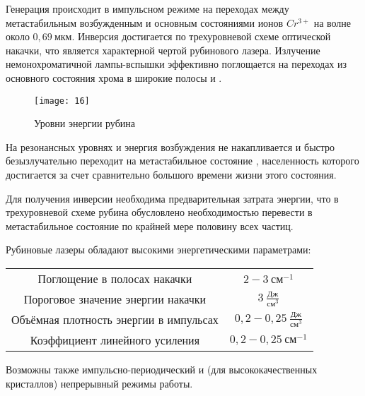 Генерация происходит в импульсном режиме на переходах между метастабильным
возбужденным и основным состояниями ионов \( Cr^{3+} \) на волне около
\( 0,69~\text{мкм} \). Инверсия достигается по трехуровневой схеме оптической
накачки, что является характерной чертой рубинового лазера. Излучение
немонохроматичной лампы-вспышки эффективно поглощается на переходах из
основного состояния хрома  в широкие полосы
 и .

\begin{figure}[h]
    \center
    \texttt{[image: 16]}
    \caption{Уровни энергии рубина}
\end{figure}

На резонансных уровнях  и  энергия возбуждения не
накапливается и быстро безызлучательно переходит на метастабильное состояние 
, населенность которого достигается за счет сравнительно большого 
времени жизни этого состояния.

Для получения инверсии необходима предварительная затрата энергии, что в
трехуровневой схеме рубина обусловлено необходимостью перевести в метастабильное
состояние по крайней мере половину всех частиц.

Рубиновые лазеры обладают высокими энергетическими параметрами:
\begin{center}
    \begin{tabular}{|c|c|} \hline
        Поглощение в полосах накачки & \( 2-3~\text{см}^{-1} \) \\
        Пороговое значение энергии накачки &
            \( 3~\frac{\text{Дж}}{\text{см}^{3}} \) \\
        Объёмная плотность энергии в импульсах &
            \( 0,2-0,25~\frac{\text{Дж}}{\text{см}^{3}} \) \\
        Коэффициент линейного усиления & \( 0,2-0,25~\text{см}^{-1} \) \\
        \hline
    \end{tabular}
\end{center}

Возможны также импульсно-периодический и (для высококачественных кристаллов)
непрерывный режимы работы.

